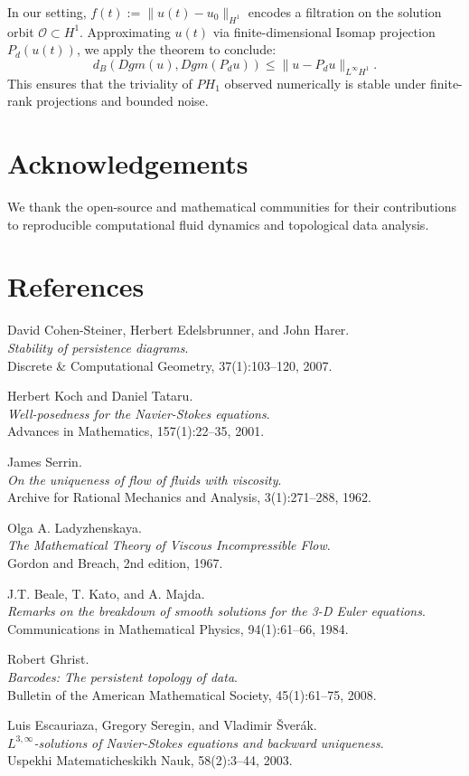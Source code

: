 \documentclass[11pt]{article}
\theoremstyle{definition}
\begin{document}
\noindent In our setting, $f(t) := \|u(t) - u_0\|_{H^1}$ encodes a filtration on the solution orbit $\mathcal O \subset H^1$. Approximating $u(t)$ via finite-dimensional Isomap projection $P_d(u(t))$, we apply the theorem to conclude:
\[
d_B(Dgm(u), Dgm(P_d u)) \le \|u - P_d u\|_{L^\infty H^1}.
\]
This ensures that the triviality of $PH_1$ observed numerically is stable under finite-rank projections and bounded noise.

\section*{Acknowledgements}
We thank the open-source and mathematical communities for their contributions to reproducible computational fluid dynamics and topological data analysis.

\section*{References}
\begin{thebibliography}{9}

David Cohen-Steiner, Herbert Edelsbrunner, and John Harer.\\
\textit{Stability of persistence diagrams}.\\
Discrete \& Computational Geometry, 37(1):103--120, 2007.

Herbert Koch and Daniel Tataru.\\
\textit{Well-posedness for the Navier-Stokes equations}.\\
Advances in Mathematics, 157(1):22--35, 2001.

James Serrin.\\
\textit{On the uniqueness of flow of fluids with viscosity}.\\
Archive for Rational Mechanics and Analysis, 3(1):271--288, 1962.

Olga A. Ladyzhenskaya.\\
\textit{The Mathematical Theory of Viscous Incompressible Flow}.\\
Gordon and Breach, 2nd edition, 1967.

J.T. Beale, T. Kato, and A. Majda.\\
\textit{Remarks on the breakdown of smooth solutions for the 3-D Euler equations}.\\
Communications in Mathematical Physics, 94(1):61--66, 1984.

Robert Ghrist.\\
\textit{Barcodes: The persistent topology of data}.\\
Bulletin of the American Mathematical Society, 45(1):61--75, 2008.

Luis Escauriaza, Gregory Seregin, and Vladimir Šverák.\\
\textit{$L^{3,\infty}$-solutions of Navier-Stokes equations and backward uniqueness}.\\
Uspekhi Matematicheskikh Nauk, 58(2):3–44, 2003.

\end{thebibliography}
\end{document}
